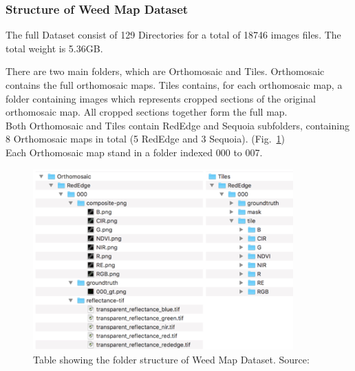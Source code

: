\subsubsection{Structure of Weed Map Dataset}

The full Dataset consist of 129 Directories for a total of 18746 images files. The total weight is 5.36GB.

There are two main folders, which are Orthomosaic and Tiles.
Orthomosaic contains the full orthomosaic maps.
Tiles contains, for each orthomosaic map, a folder containing images which represents cropped sections of the original orthomosaic map. All cropped sections together form the full map.
\\[0.3cm]Both Orthomosaic and Tiles contain RedEdge and Sequoia subfolders, containing 8 Orthomosaic maps in total (5 RedEdge and 3 Sequoia). (Fig.~\ref{fig:figure-4.5.3})
\\[0.3cm]Each Orthomosaic map stand in a folder indexed 000 to 007.
\begin{figure}[t]
	\centering
	\includegraphics[width=10cm]{figures/figure-4.5.3.png}
	\caption[Folder Structure Weed Map Dataset]{Table showing the folder structure of Weed Map Dataset. Source:~\cite{Tesi-2.1}}
	\label{fig:figure-4.5.3}
\end{figure}

